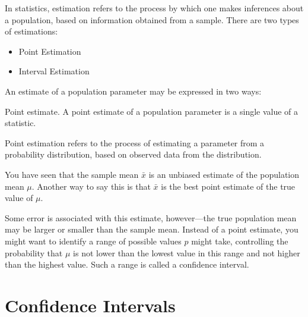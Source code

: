 
In statistics, estimation refers to the process by which one makes inferences about a population, based on information obtained from a sample.
There are two types of estimations:

\begin{itemize}
\item Point Estimation
\item Interval Estimation
\end{itemize}



An estimate of a population parameter may be expressed in two ways:

Point estimate. A point estimate of a population parameter is a single value of a statistic. 




Point estimation refers to the process of estimating a parameter from a probability 
distribution, based on observed data from the distribution. 





You have seen that the sample mean $\bar{x}$ is an unbiased estimate of the population mean $\mu$. 
Another way to say this is that $\bar{x}$  is the best point estimate of the true value of $\mu$. 



Some error is associated with this estimate, however—the true population mean may be larger 
or smaller than the sample mean. Instead of a point estimate, you might want to identify a 
range of possible values $p$ might take, controlling the probability that $\mu$ is not lower 
than the lowest value in this 
range and not higher than the highest value. Such a range is called a confidence interval.




\section{Confidence Intervals}

